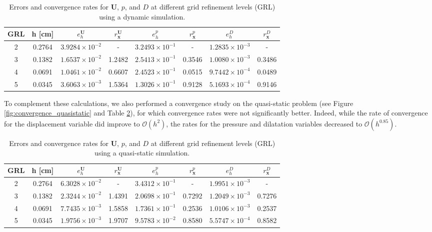 \documentclass{sfuthesis}
\numberwithin{equation}{section}
\numberwithin{figure}{chapter}
\numberwithin{table}{chapter}
\theoremstyle{definition}
\def\*#1{{\mathbf{#1}}} %
\begin{document}
\begin{table}
\centering
\small
\begin{tabular}{cccccccc}
\hline
GRL & h [cm] & $e_h^{\*U}$ & $r_{\*x}^\*U$ & $e_h^{p}$ & $r_{\*x}^p$  & $e_h^{D}$ & $r_{\*x}^D$  \\
\hline
2 & 0.2764 & $3.9284 \times 10^{-2}$ & -      & $3.2493 \times 10^{-1}$ & -        & $1.2835 \times 10^{-3}$ & - \\
3 & 0.1382 & $1.6537 \times 10^{-2}$ & 1.2482 & $2.5413 \times 10^{-1}$ & 0.3546   & $1.0080 \times 10^{-3}$ & 0.3486 \\
4 & 0.0691 & $1.0461 \times 10^{-2}$ & 0.6607 & $2.4523 \times 10^{-1}$ & 0.0515   & $9.7442 \times 10^{-4}$ & 0.0489 \\
5 & 0.0345 & $3.6063 \times 10^{-3}$ & 1.5364 & $1.3026 \times 10^{-1}$ & 0.9128   & $5.1693 \times 10^{-4}$ & 0.9146 \\
\hline
\end{tabular}
\caption{Errors and convergence rates for $\*U$, $p$, and $D$ at different grid refinement levels (GRL) using a dynamic simulation.\label{tab:errors_rates_space}}
\end{table}



To complement these calculations, we also performed a convergence study on the quasi-static problem (see Figure \ref{fig:convergence_quasistatic} and Table \ref{tab:errors_rates_space_qs}), for which convergence rates were not significantly better. Indeed, while the rate of convergence for the displacement variable did improve to $\mathcal{O}(h^2)$, the rates for the pressure and dilatation variables decreased to $\mathcal{O}(h^{0.85})$.

\begin{table}
\centering
\small
\begin{tabular}{cccccccc}
\hline
GRL & h [cm] & $e_h^{\*U}$ & $r_{\*x}^\*U$ & $e_h^{p}$ & $r_{\*x}^p$  & $e_h^{D}$ & $r_{\*x}^D$  \\
\hline
2 & 0.2764 & $6.3028 \times 10^{-2}$ & -      & $3.4312 \times 10^{-1}$ & -        & $1.9951 \times 10^{-3}$ & - \\
3 & 0.1382 & $2.3244 \times 10^{-2}$ & 1.4391 & $2.0698 \times 10^{-1}$ & 0.7292   & $1.2049 \times 10^{-3}$ & 0.7276 \\
4 & 0.0691 & $7.7435 \times 10^{-3}$ & 1.5858 & $1.7361 \times 10^{-1}$ & 0.2536   & $1.0106 \times 10^{-3}$ & 0.2537 \\
5 & 0.0345 & $1.9756 \times 10^{-3}$ & 1.9707 & $9.5783 \times 10^{-2}$ & 0.8580   & $5.5747 \times 10^{-4}$ & 0.8582 \\
\hline
\end{tabular}
\caption{Errors and convergence rates for $\*U$, $p$, and $D$ at different grid refinement levels (GRL) using a quasi-static simulation.\label{tab:errors_rates_space_qs}}
\end{table}
\end{document}
